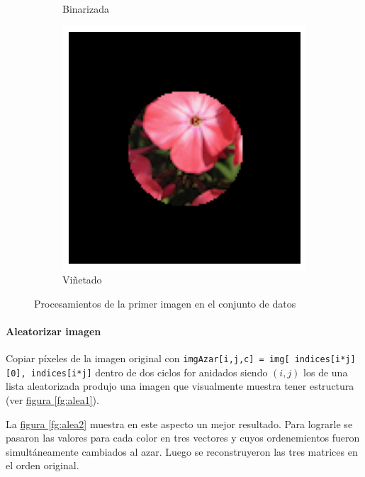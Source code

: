 \documentclass{article}
\begin{document}
\begin{figure}
\begin{subfigure}[b]{0.24\textwidth}
		\caption{Binarizada}
		\label{fg:imgGrau0binarizada}
	\end{subfigure}
	\begin{subfigure}[b]{0.24\textwidth}
		\includegraphics[width= \textwidth]{circle}
		\caption{Viñetado}
		\label{fg:circle}
	\end{subfigure}
	\caption{Procesamientos de la primer imagen en el conjunto de datos}
\end{figure}




\paragraph{Aleatorizar imagen} 
Copiar píxeles de la imagen original con \verb'imgAzar[i,j,c] = img[ indices[i*j][0], indices[i*j]' dentro de dos ciclos for anidados siendo \((i,j)\) los  de una lista aleatorizada produjo una imagen que visualmente muestra tener estructura (ver \hyperref[fg:alea1]{figura \ref*{fg:alea1}}).

La \hyperref[fg:alea2]{figura \ref*{fg:alea2}} muestra en este aspecto un mejor resultado.
Para lograrle se pasaron las valores para cada color en tres vectores y cuyos ordenemientos fueron simultáneamente cambiados al azar.
Luego se reconstruyeron las tres matrices en el orden original.
\end{document}
